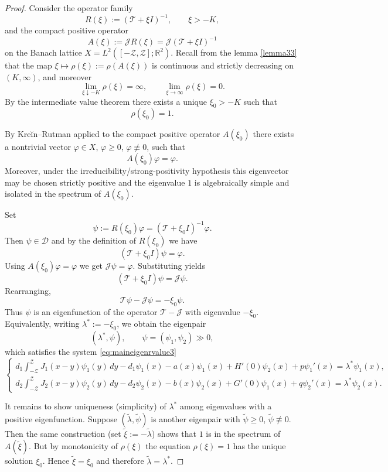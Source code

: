 \documentclass[a4paper,11pt]{amsart}
\theoremstyle{definition}
\numberwithin{equation}{section}
\theoremstyle{definition}
\begin{document}
\begin{proof}
Consider the operator family
\[
R(\xi):=(\mathscr T+\xi I)^{-1},\qquad \xi>-K,
\]
and the compact positive operator
\[
A(\xi):=\mathscr J R(\xi)=\mathscr J(\mathscr T+\xi I)^{-1}
\]
on the Banach lattice \(X=L^2([-{\mathcal Z},{\mathcal Z}];\mathbb R^2)\).
Recall from the  lemma \eqref{lemma33} that the map \(\xi\mapsto \rho(\xi):=\rho(A(\xi))\) is continuous and strictly decreasing on \((K,\infty)\), and moreover
\[
\lim_{\xi\downarrow -K}\rho(\xi)=\infty,\qquad \lim_{\xi\to\infty}\rho(\xi)=0.
\]
By the intermediate value theorem there exists a unique \(\xi_0>-K\) such that
\[
\rho(\xi_0)=1.
\]

By Kreĭn--Rutman applied to the compact positive operator \(A(\xi_0)\) there exists a nontrivial vector
\(\varphi\in X\), \(\varphi\ge 0\), \(\varphi\not\equiv 0\), such that
\[
A(\xi_0)\varphi = \varphi.
\]
Moreover, under the irreducibility/strong-positivity hypothesis this eigenvector may be chosen strictly positive and the eigenvalue \(1\) is algebraically simple and isolated in the spectrum of \(A(\xi_0)\).

Set
\[
\psi := R(\xi_0)\varphi = (\mathscr T+\xi_0 I)^{-1}\varphi.
\]
Then \(\psi\in\mathcal D\) and by the definition of \(R(\xi_0)\) we have
\[
(\mathscr T+\xi_0 I)\psi = \varphi.
\]
Using \(A(\xi_0)\varphi=\varphi\) we get \(\mathscr J\psi = \varphi\). Substituting yields
\[
(\mathscr T+\xi_0 I)\psi = \mathscr J\psi.
\]
Rearranging,
\[
\mathscr T\psi - \mathscr J\psi = -\xi_0 \psi.
\]
Thus \(\psi\) is an eigenfunction of the operator \(\mathscr T-\mathscr J\) with eigenvalue \(-\xi_0\). Equivalently, writing \(\lambda^\ast:=-\xi_0\), we obtain the eigenpair
\[
(\lambda^\ast,\psi),\qquad \psi=(\psi_1,\psi_2)\gg0,
\]
which satisfies the system \eqref{eq:maineigenrvalue3}
\[
\begin{cases}
d_1\displaystyle\int_{-{\mathcal Z}}^{\mathcal Z}J_1(x-y)\psi_1(y)\,dy - d_1\psi_1(x) - a(x)\psi_1(x) + H'(0)\psi_2(x) + p\psi_1'(x)
= \lambda^\ast \psi_1(x),\\[6pt]
d_2\displaystyle\int_{-{\mathcal Z}}^{\mathcal Z}J_2(x-y)\psi_2(y)\,dy - d_2\psi_2(x) - b(x)\psi_2(x) + G'(0)\psi_1(x) + q\psi_2'(x)
= \lambda^\ast \psi_2(x).
\end{cases}
\]

It remains to show uniqueness (simplicity) of \(\lambda^\ast\) among eigenvalues with a positive eigenfunction. Suppose \((\tilde\lambda,\tilde\psi)\) is another eigenpair with \(\tilde\psi\geq0\), \(\tilde\psi\not\equiv0\). Then the same construction (set \(\tilde\xi:=-\tilde\lambda\)) shows that \(1\) is in the spectrum of \(A(\tilde\xi)\). But by monotonicity of \(\rho(\xi)\) the equation \(\rho(\xi)=1\) has the unique solution \(\xi_0\). Hence \(\tilde\xi=\xi_0\) and therefore \(\tilde\lambda=\lambda^\ast\).


\end{proof}
\end{document}
